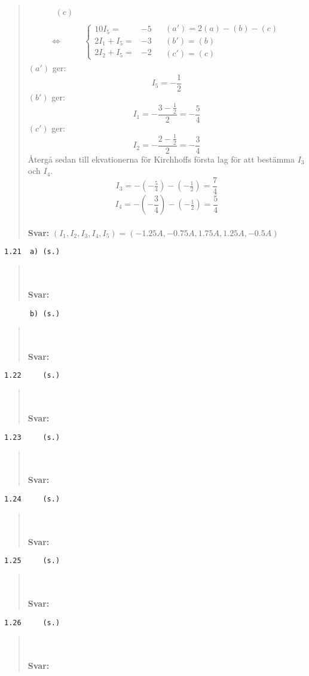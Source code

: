 \documentclass[a4paper]{article}
\newcommand{\tskcol}[1]{\textcolor{tskcol}{#1}}
\begin{document}
\begin{quotation}
\begin{align*}
\begin{array}{l}
	(c)
	\end{array} \\ \Leftrightarrow
	&\left\{\begin{array}{rr}
	10I_5=&-5 \\
	2I_1+I_5=&-3 \\
	2I_2+I_5=&-2 
	\end{array}\right.
	&\begin{array}{l}
	(a')=2(a)-(b)-(c) \\
	(b')=(b) \\
	(c')=(c)
	\end{array}
	\end{align*}
	$(a')$ ger:
	\[I_5=-\frac{1}{2}\]
	$(b')$ ger:
	\[I_1=-\frac{3-\frac{1}{2}}{2}=-\frac{5}{4}\]
	$(c')$ ger:
	\[I_2=-\frac{2-\frac{1}{2}}{2}=-\frac{3}{4}\]
	Återgå sedan till ekvationerna för Kirchhoffs första lag för att bestämma $I_3$ och $I_4$.
	\[I_3=-(-\tfrac{5}{4})-(-\tfrac{1}{2})=\frac{7}{4}\]
	\[I_4=-(-\frac{3}{4})-(-\tfrac{1}{2})=\frac{5}{4}\]
	\\
	\textbf{Svar:} $(I_1,I_2,I_3,I_4,I_5)=(-1.25A,-0.75A,1.75A,1.25A,-0.5A)$
\end{quotation}

\texttt{\tskcol{1.21~~a) (s.)}}
\begin{quotation}
	\noindent
	\\ \\
	\textbf{Svar:}
\end{quotation}

\texttt{\tskcol{~~~~~~b) (s.)}}
\begin{quotation}
	\noindent
	\\ \\
	\textbf{Svar:}
\end{quotation}

\texttt{\tskcol{1.22~~~~ (s.)}}
\begin{quotation}
	\noindent
	\\ \\
	\textbf{Svar:}
\end{quotation}

\texttt{\tskcol{1.23~~~~ (s.)}}
\begin{quotation}
	\noindent
	\\ \\
	\textbf{Svar:}
\end{quotation}

\texttt{\tskcol{1.24~~~~ (s.)}}
\begin{quotation}
	\noindent
	\\ \\
	\textbf{Svar:}
\end{quotation}

\texttt{\tskcol{1.25~~~~ (s.)}}
\begin{quotation}
	\noindent
	\\ \\
	\textbf{Svar:}
\end{quotation}

\texttt{\tskcol{1.26~~~~ (s.)}}
\begin{quotation}
	\noindent
	\\ \\
	\textbf{Svar:}
\end{quotation}
\end{document}
